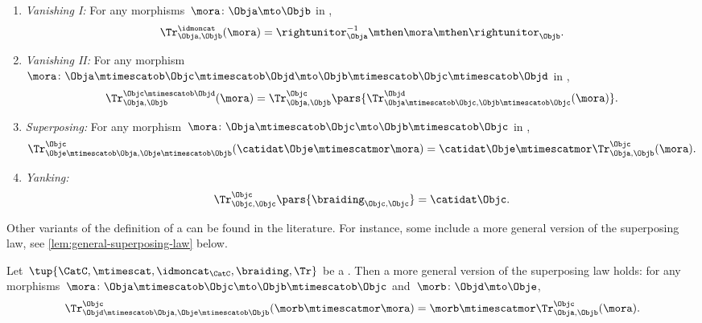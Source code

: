 \begin{ctdefinition}
\begin{enumerate}
        \item \emph{Vanishing I:}
              For any morphisms~$\mora \colon \Obja\mto \Objb$ in \CatC,
              \begin{equation}
                  \label{eq:vanishing_1}
                  \Tr_{\Obja,\Objb}^\idmoncat (\mora)= \rightunitor^{-1}_{\Obja} \mthen \mora \mthen \rightunitor_\Objb.
              \end{equation}
        \item \emph{Vanishing II:}
              For any morphism~$\mora \colon \Obja\mtimescatob \Objc \mtimescatob \Objd \mto \Objb\mtimescatob \Objc \mtimescatob \Objd$ in \CatC,
              \begin{equation}
                  \label{eq:vanishing_2}
                  \Tr_{\Obja,\Objb}^{\Objc\mtimescatob \Objd}(\mora)=\Tr_{\Obja,\Objb}^\Objc\pars{
                      \Tr_{\Obja \mtimescatob \Objc, \Objb \mtimescatob \Objc}^\Objd(\mora)}.
              \end{equation}
        \item \emph{Superposing:}
              For any morphism~$\mora\colon \Obja\mtimescatob \Objc \mto \Objb\mtimescatob \Objc$ in \CatC,
              \begin{equation}
                  \label{eq:superposing}
                  \Tr_{\Obje\mtimescatob \Obja,\Obje\mtimescatob \Objb}^{\Objc}(\catidat\Obje\mtimescatmor \mora)=\catidat\Obje\mtimescatmor \Tr_{\Obja,\Objb}^\Objc(\mora).
              \end{equation}
        \item \emph{Yanking:}
              \begin{equation}
                  \label{eq:yanking}
                  \Tr_{\Objc,\Objc}^\Objc\pars{\braiding_{\Objc,\Objc}}=\catidat\Objc.
              \end{equation}
    \end{enumerate}
\end{ctdefinition}

\begin{remark}
    Other variants of the definition of a  can be found in the literature.
    For instance, some include a more general version of the superposing law, see \cref{lem:general-superposing-law} below.
\end{remark}

\begin{lemma}
    \label{lem:general-superposing-law}
    Let~$\tup{\CatC, \mtimescat,\idmoncat_{\CatC}, \braiding, \Tr}$ be a .
    Then a more general version of the superposing law holds: for any morphisms~$\mora\colon \Obja\mtimescatob \Objc \mto \Objb \mtimescatob \Objc$ and~$\morb \colon \Objd \mto \Obje$,
    \begin{equation}
        \label{eq:superposing_2}
        \Tr_{\Objd\mtimescatob \Obja,\Obje\mtimescatob \Objb}^{\Objc}(\morb \mtimescatmor \mora)=\morb \mtimescatmor \Tr_{\Obja,\Objb}^\Objc(\mora).
    \end{equation}
\end{lemma}
\missingproof


